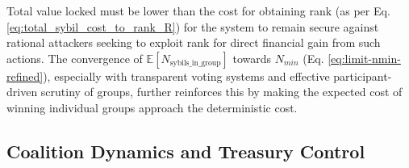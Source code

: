 \documentclass{article}
\begin{document}
\begin{CJK}{UTF8}{gbsn}
        Total value locked must be lower than the cost for obtaining rank (as per Eq. \ref{eq:total_sybil_cost_to_rank_R}) for the system to remain secure against rational attackers seeking to exploit rank for direct financial gain from such actions. The convergence of $\mathbb{E}[N_{\text{sybils\_in\_group}}]$ towards $N_{min}$ (Eq. \ref{eq:limit-nmin-refined}), especially with transparent voting systems and effective {{participant-driven scrutiny of groups}}, further reinforces this by making the expected cost of winning individual groups approach the deterministic cost.

        \subsection{Coalition Dynamics and Treasury Control}
        \label{sec:time-constraint}


\end{CJK}
\end{document}
